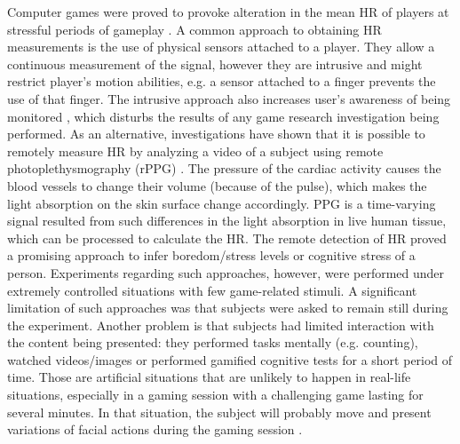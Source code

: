 Computer games were proved to provoke alteration in the mean HR of players at stressful periods of gameplay \citep{sharma2006assessment,rodriguez2015vr}. A common approach to obtaining HR measurements is the use of physical sensors attached to a player. They allow a continuous measurement of the signal, however they are intrusive and might restrict player's motion abilities, e.g. a sensor attached to a finger prevents the use of that finger. The intrusive approach also increases user's awareness of being monitored \citep{yamakoshi2007preliminary,yamaguchi2006evaluation,healey2005detecting}, which disturbs the results of any game research investigation being performed.
As an alternative, investigations \citep{mcduff2015survey} have shown that it is possible to remotely measure HR by analyzing a video of a subject using remote photoplethysmography (rPPG) \citep{allen2007photoplethysmography}. The pressure of the cardiac activity causes the blood vessels to change their volume (because of the pulse), which makes the light absorption on the skin surface change accordingly. PPG is a time-varying signal resulted from such differences in the light absorption in live human tissue, which can be processed to calculate the HR. The remote detection of HR proved a promising approach to infer boredom/stress levels \citep{kukolja2014comparative} or cognitive stress \citep{mcduff2014remote} of a person. Experiments regarding such approaches, however, were performed under extremely controlled situations with few game-related stimuli. A significant limitation of such approaches was that subjects were asked to remain still during the experiment. Another problem is that subjects had limited interaction with the content being presented: they performed tasks mentally (e.g. counting), watched videos/images or performed gamified cognitive tests for a short period of time. Those are artificial situations that are unlikely to happen in real-life situations, especially in a gaming session with a challenging game lasting for several minutes. In that situation, the subject will probably move and present variations of facial actions during the gaming session \ifblind[author(s)]\else\citep{bevilacqua2016variations}\fi.

